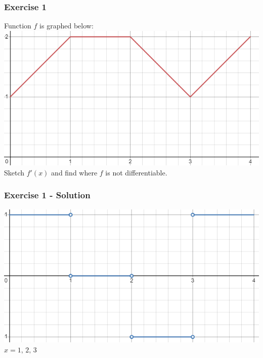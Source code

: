 \documentclass[12pt]{beamer}
\begin{document}
\begin{frame}
	\frametitle{Exercise 1}
	
	\begin{center}
		\vfill
		Function $f$ is graphed below:
		\vfill
		\includegraphics[scale=0.5]{exercise_1_graph.png}
		\vfill
		Sketch $f'(x)$ and find where $f$ is not differentiable.
		\vfill
	\end{center}
\end{frame}
\begin{frame}
	\frametitle{Exercise 1 - Solution}

	\begin{center}
		\includegraphics[scale=0.6]{exercise_1_solution_graph.png}
		\vfill
		$\boxed{x=1\text{, }2\text{, }3}$
	\end{center}
\end{frame}
\end{document}
